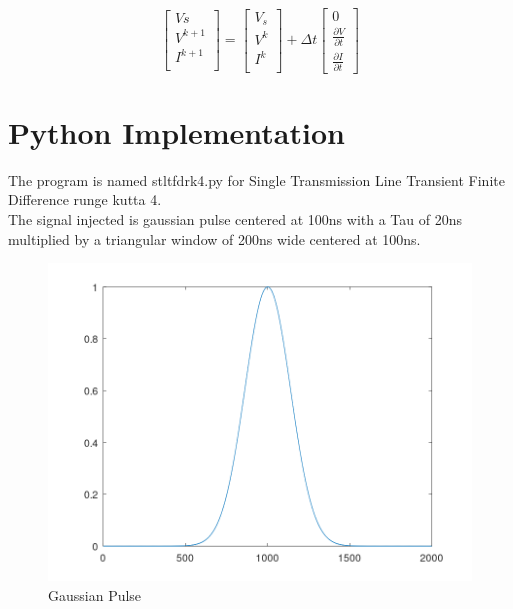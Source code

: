 \documentclass[12pt, letterpaper]{article}
\begin{document}
\begin{equation}
	\begin{bmatrix}
		Vs \\
		V^{k+1} \\
		I^{k+1} \\
	\end{bmatrix}
	=
	\begin{bmatrix}
		V_s \\
		V^k \\
		I^k \\
	\end{bmatrix}
	+
	\Delta t
	\begin{bmatrix}
		0 \\
		\frac{\partial{V}}{\partial{t}} \\
		\frac{\partial{I}}{\partial{t}} 
	\end{bmatrix}	
\end{equation}


\section{Python Implementation}
The program is named stltfdrk4.py for Single Transmission Line Transient Finite Difference runge kutta 4.\\

The signal injected is  gaussian pulse centered at 100ns with a Tau of 20ns multiplied by a triangular window of 200ns wide centered at 100ns.\\

\begin{figure}[H]
	\centering
	\includegraphics[width=1\textwidth]{gaussian_pulse.png}
	\caption{Gaussian Pulse}
\end{figure}
\end{document}

